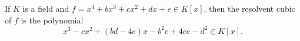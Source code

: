 If $K$ is a field and $f = x^4 + bx^3 + cx^2 + dx + e \in K[x]$, then the resolvent cubic of $f$ is the polynomial
$$x^3 - cx^2 + (bd - 4e)x - b^2e + 4ce - d^2 \in K[x].$$
